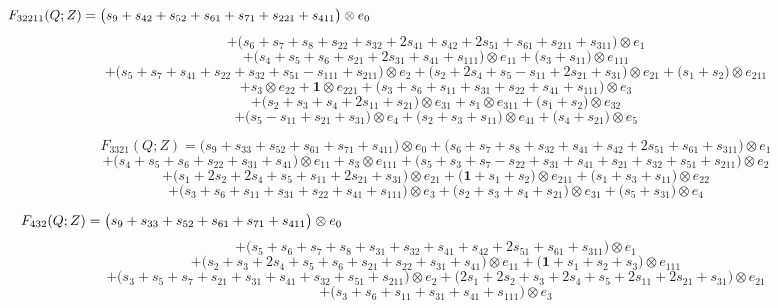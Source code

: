 \documentclass[12pt]{amsart}
\theoremstyle{plain}
\theoremstyle{definition}
\theoremstyle{remark}
\begin{document}
$$F_{ 32211 }(Q;Z)=
\big( s_{9} + s_{42} + s_{52} + s_{61} + s_{71} + s_{221} + s_{411} \big) \otimes e_{ 0 }  \hskip 5in \  $$ $$
+\big( s_{6} + s_{7} + s_{8} + s_{22} + s_{32} + 2 s_{41} + s_{42} + 2 s_{51} + s_{61} + s_{211} + s_{311} \big) \otimes e_{ 1 } $$ $$
+\big( s_{4} + s_{5} + s_{6} + s_{21} + 2 s_{31} + s_{41} + s_{111} \big) \otimes e_{ 11 }
+\big( s_{3} + s_{11} \big) \otimes e_{ 111 } $$ $$
+\big( s_{5} + s_{7} + s_{41} + s_{22} + s_{32} + s_{51} - s_{111} + s_{211} \big) \otimes e_{ 2 }
+\big( s_{2} + 2 s_{4} + s_{5} - s_{11} + 2 s_{21} + s_{31} \big) \otimes e_{ 21 }
+\big( s_{1} + s_{2} \big) \otimes e_{ 211 } $$ $$
+ s_{3} \otimes e_{ 22 }
+ \boldsymbol{1} \otimes e_{ 221 }
+\big( s_{3} + s_{6} + s_{11} + s_{31} + s_{22} + s_{41} + s_{111} \big) \otimes e_{ 3 } $$ $$
+\big( s_{2} + s_{3} + s_{4} + 2 s_{11} + s_{21} \big) \otimes e_{ 31 }
+ s_{1} \otimes e_{ 311 }
+\big( s_{1} + s_{2} \big) \otimes e_{ 32 } $$ $$
+\big( s_{5} - s_{11} + s_{21} + s_{31} \big) \otimes e_{ 4 }
+\big( s_{2} + s_{3} + s_{11} \big) \otimes e_{ 41 }
+\big( s_{4} + s_{21} \big) \otimes e_{ 5 }
$$

$$F_{ 3321 }(Q;Z)=
\big( s_{9} + s_{33} + s_{52} + s_{61} + s_{71} + s_{411} \big) \otimes e_{ 0 }
+\big( s_{6} + s_{7} + s_{8} + s_{32} + s_{41} + s_{42} + 2 s_{51} + s_{61} + s_{311} \big) \otimes e_{ 1 } $$ $$
+\big( s_{4} + s_{5} + s_{6} + s_{22} + s_{31} + s_{41} \big) \otimes e_{ 11 }
+ s_{3} \otimes e_{ 111 } 
+\big( s_{5} + s_{3} + s_{7} - s_{22} + s_{31} + s_{41} + s_{21} + s_{32} + s_{51} + s_{211} \big) \otimes e_{ 2 } $$ $$
+\big( s_{1} + 2 s_{2} + 2 s_{4} + s_{5} + s_{11} + 2 s_{21} + s_{31} \big) \otimes e_{ 21 } 
+\big( \boldsymbol{1} + s_{1} + s_{2} \big) \otimes e_{ 211 }
+\big( s_{1} + s_{3} + s_{11} \big) \otimes e_{ 22 } $$ $$
+\big( s_{3} + s_{6} + s_{11} + s_{31} + s_{22} + s_{41} + s_{111} \big) \otimes e_{ 3 }
+\big( s_{2} + s_{3} + s_{4} + s_{21} \big) \otimes e_{ 31 }
+\big( s_{5} + s_{31} \big) \otimes e_{ 4 }
$$

$$F_{ 432 }(Q;Z)=
\big( s_{9} + s_{33} + s_{52} + s_{61} + s_{71} + s_{411} \big) \otimes e_{ 0 }  \hskip 5in \  $$ $$
+\big( s_{5} + s_{6} + s_{7} + s_{8} + s_{31} + s_{32} + s_{41} + s_{42} + 2 s_{51} + s_{61} + s_{311} \big) \otimes e_{ 1 } $$ $$
+\big( s_{2} + s_{3} + 2 s_{4} + s_{5} + s_{6} + s_{21} + s_{22} + s_{31} + s_{41} \big) \otimes e_{ 11 }
+\big( \boldsymbol{1} + s_{1} + s_{2} + s_{3} \big) \otimes e_{ 111 } $$ $$
+\big( s_{3} + s_{5} + s_{7} + s_{21} + s_{31} + s_{41} + s_{32} + s_{51} + s_{211} \big) \otimes e_{ 2 }
+\big( 2 s_{1} + 2 s_{2} + s_{3} + 2 s_{4} + s_{5} + 2 s_{11} + 2 s_{21} + s_{31} \big) \otimes e_{ 21 } $$ $$
+\big( s_{3} + s_{6} + s_{11} + s_{31} + s_{41} + s_{111} \big) \otimes e_{ 3 }
$$
\end{document}
